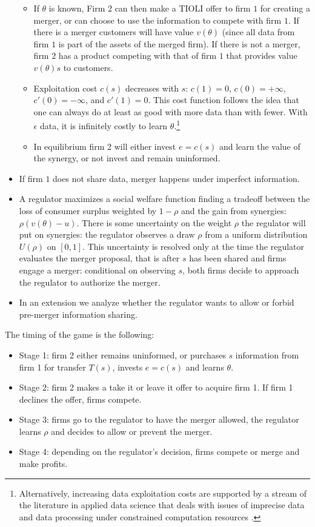 \documentclass[a4paper,leqno]{article}%
\renewcommand{\t}{\theta}
\renewcommand{\t}{\theta}
\begin{document}
\begin{itemize}
\begin{itemize}
        \item If $\t$ is known, Firm 2 can then make a TIOLI offer to firm $1$ for creating a merger, or can choose to use the information to compete with firm $1$. If there is a merger customers will have value $v(\t)$ (since all data from firm $1$ is part of the assets of the merged firm). If there is not a merger, firm $2$ has a product competing with that of firm $1$ that provides value $v(\t)s$ to customers.
        \item Exploitation cost $c(s)$ decreases with $s$: $c(1)=0$, $c(0)=+\infty$, $c'(0)=-\infty$, and $c'(1)=0$. This cost function follows the idea that one can always do at least as good with more data than with fewer. With $\epsilon$ data, it is infinitely costly to learn $\t$.\footnote{Alternatively, increasing data exploitation costs are supported by a stream of the literature in applied data science that deals with issues of imprecise data and data processing under constrained computation resources \citep{hernandez1995merge}.}
        \item In equilibrium firm 2 will either invest $e=c(s)$ and learn the value of the synergy, or not invest and remain uninformed.
    \end{itemize}
    \item If firm $1$ does not share data, merger happens under imperfect information.
    \item A regulator maximizes a social welfare function finding a tradeoff between the loss of consumer surplus weighted by $1-\rho$ and the gain from synergies: $\rho (v(\t)-u)$. There is some uncertainty on the weight $\rho$ the regulator will put on synergies: the regulator observes a draw $\rho$ from a uniform distribution $U(\rho)$ on $[0,1]$. This uncertainty is resolved only at the time the regulator evaluates the merger proposal, that is after $s$ has been shared and firms engage a merger: conditional on observing $s$, both firms decide to approach the regulator to authorize the merger.
    \item In an extension we analyze whether the regulator wants to allow or forbid pre-merger information sharing.
\medskip
\end{itemize}

The timing of the game is the following:


\begin{itemize}[label={--}]
    \item Stage 1: firm 2 either remains uninformed, or purchases $s$ information from firm 1 for transfer $T(s)$, invests $e=c(s)$ and learns $\t$.
    \item Stage 2: firm 2 makes a take it or leave it offer to acquire firm 1. If firm 1 declines the offer, firms compete.
    \item Stage 3: firms go to the regulator to have the merger allowed, the regulator learns $\rho$ and decides to allow or prevent the merger.
    \item Stage 4: depending on the regulator's decision, firms compete or merge and make profits.
\end{itemize}
\end{document}
